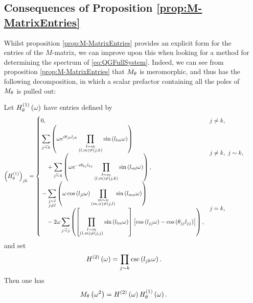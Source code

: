 \subsection{Consequences of Proposition \ref{prop:M-MatrixEntries}} \label{ssec:MMatrixConsequences}
Whilst proposition \ref{prop:M-MatrixEntries} provides an explicit form for the entries of the $M$-matrix, we can improve upon this when looking for a method for determining the spectrum of \eqref{eq:QGFullSystem}.
Indeed, we can see from proposition \ref{prop:M-MatrixEntries} that $M_\theta$ is meromorphic, and thus has the following decomposition, in which a scalar prefactor containing all the poles of $M_\theta$ is pulled out:
\begin{cory} \label{cory:M-MatrixEntriesNoPoles}
	Let $H^{(1)}_\theta\left( \omega \right)$ have entries defined by
	\begin{align*}
		\bracs{H^{(1)}_\qm}_{jk} &= 
		\begin{cases}
			\!\begin{aligned}
				&0,
			\end{aligned}			
			& j \not\con k, \\
			\!\begin{aligned}
				&\sum_{j\conLeft k} \bracs{ \omega e^{i\qm_{jk}l_{jk}} \prod_{\substack{ l\con m \\ \bracs{l,m} \neq \bracs{j,k} }}\sin\bracs{l_{lm}\omega} }
				\\ &\quad + \sum_{j\conRight k} \bracs{ \omega e^{-i\qm_{kj}l_{kj}} \prod_{\substack{l\con m \\ \bracs{l,m} \neq \bracs{j,k} }}\sin\bracs{l_{ml}\omega} },
			\end{aligned}
			& j\neq k, \ j\con k, \\
			\!\begin{aligned}
				&- \sum_{\substack{j\con l \\ j\neq l}} \bracs{ \omega\cos\bracs{l_{jl}\omega}\prod_{\substack{ m\con n \\ \bracs{m,n}\neq\bracs{j,l} }}\sin\bracs{l_{mn}\omega} }
				\\ &\quad - 2\omega\sum_{j\conLeft j} \bracs{ \sqbracs{ \prod_{\substack{l\con m \\ \bracs{l,m}\neq\bracs{j,j} }}\sin\bracs{l_{lm}\omega} }\bigl[ \cos\bracs{l_{jj}\omega} - \cos\bracs{\qm_{jj}l_{jj}} \bigr] },
			\end{aligned}
			& j=k,
		\end{cases}
	\end{align*}
	and set
	\begin{align*}
		H^{(2)}\left( \omega \right) &= \prod_{j\sim k}\csc\left( l_{jk}\omega \right).
	\end{align*}
	Then one has
	\begin{align*}
		M_\theta\left( \omega^2 \right) &= H^{(2)}\left( \omega \right)H^{(1)}_\theta\left( \omega \right).
	\end{align*}
\end{cory}
